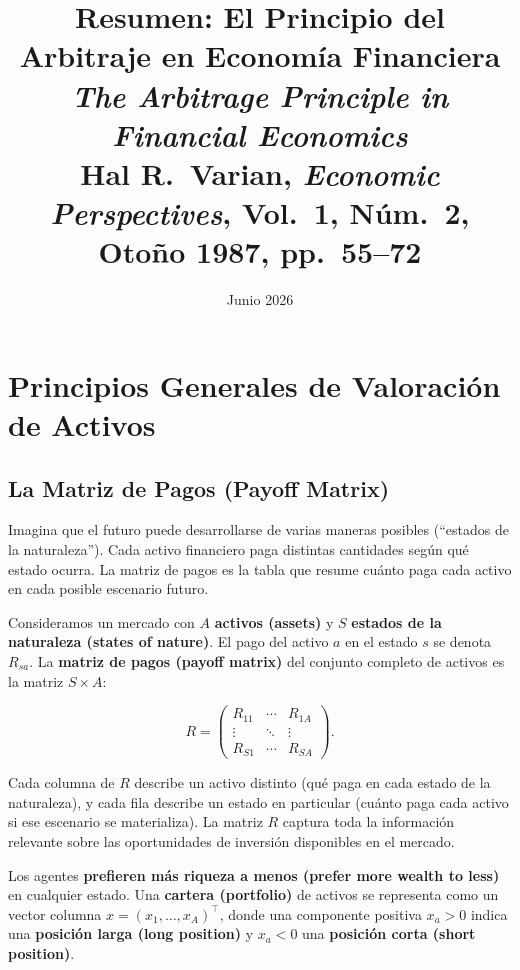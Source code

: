\documentclass[12pt]{article}
\title{\textbf{Resumen: El Principio del Arbitraje en Econom\'ia Financiera}\\
\large \textit{The Arbitrage Principle in Financial Economics}\\
\normalsize Hal R.\ Varian, \textit{Economic Perspectives}, Vol.\ 1, N\'um.\ 2, Oto\~no 1987, pp.\ 55--72}
\author{}
\date{Junio 2026}
\begin{document}
\maketitle
\tableofcontents
\newpage

\section{Principios Generales de Valoraci\'on de Activos}

\subsection{La Matriz de Pagos (Payoff Matrix)}

\begin{intuicion}
Imagina que el futuro puede desarrollarse de varias maneras posibles (``estados de la naturaleza''). Cada activo financiero paga distintas cantidades seg\'un qu\'e estado ocurra. La matriz de pagos es la tabla que resume cu\'anto paga cada activo en cada posible escenario futuro.
\end{intuicion}

Consideramos un mercado con $A$ \textbf{activos (assets)} y $S$ \textbf{estados de la naturaleza (states of nature)}. El pago del activo $a$ en el estado $s$ se denota $R_{sa}$. La \textbf{matriz de pagos (payoff matrix)} del conjunto completo de activos es la matriz $S \times A$:

\begin{equation}
  R = \begin{pmatrix} R_{11} & \cdots & R_{1A} \\ \vdots & \ddots & \vdots \\ R_{S1} & \cdots & R_{SA} \end{pmatrix}.
\end{equation}

\begin{intuicionmat}
Cada columna de $R$ describe un activo distinto (qu\'e paga en cada estado de la naturaleza), y cada fila describe un estado en particular (cu\'anto paga cada activo si ese escenario se materializa). La matriz $R$ captura toda la informaci\'on relevante sobre las oportunidades de inversi\'on disponibles en el mercado.
\end{intuicionmat}

Los agentes \textbf{prefieren m\'as riqueza a menos (prefer more wealth to less)} en cualquier estado. Una \textbf{cartera (portfolio)} de activos se representa como un vector columna $x = (x_1, \ldots, x_A)^\top$, donde una componente positiva $x_a > 0$ indica una \textbf{posici\'on larga (long position)} y $x_a < 0$ una \textbf{posici\'on corta (short position)}.
\end{document}
